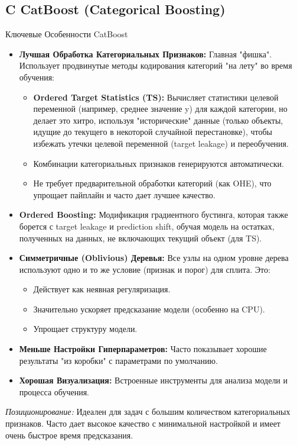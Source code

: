 \subsection{C CatBoost (Categorical Boosting)}
\begin{myblock}{Ключевые Особенности CatBoost}
    \begin{itemize}[nosep, leftmargin=*]
        \item \textbf{Лучшая Обработка Категориальных Признаков:} Главная "фишка". Использует продвинутые методы кодирования категорий "на лету" во время обучения:
            \begin{itemize}[label=\textbullet, nosep, leftmargin=*]
                 \item \textbf{Ordered Target Statistics (TS):} Вычисляет статистики целевой переменной (например, среднее значение y) для каждой категории, но делает это хитро, используя "исторические" данные (только объекты, идущие до текущего в некоторой случайной перестановке), чтобы избежать утечки целевой переменной (target leakage) и переобучения.
                 \item Комбинации категориальных признаков генерируются автоматически.
                 \item Не требует предварительной обработки категорий (как OHE), что упрощает пайплайн и часто дает лучшее качество.
            \end{itemize}
        \item \textbf{Ordered Boosting:} Модификация градиентного бустинга, которая также борется с target leakage и prediction shift, обучая модель на остатках, полученных на данных, не включающих текущий объект (для TS).
        \item \textbf{Симметричные (Oblivious) Деревья:} Все узлы на одном уровне дерева используют одно и то же условие (признак и порог) для сплита. Это:
            \begin{itemize}[label=\textbullet, nosep, leftmargin=*]
                 \item Действует как неявная регуляризация.
                 \item Значительно ускоряет предсказание модели (особенно на CPU).
                 \item Упрощает структуру модели.
            \end{itemize}
        \item \textbf{Меньше Настройки Гиперпараметров:} Часто показывает хорошие результаты "из коробки" с параметрами по умолчанию.
        \item \textbf{Хорошая Визуализация:} Встроенные инструменты для анализа модели и процесса обучения.
    \end{itemize}
    \textit{Позиционирование:} Идеален для задач с большим количеством категориальных признаков. Часто дает высокое качество с минимальной настройкой и имеет очень быстрое время предсказания.
\end{myblock}

